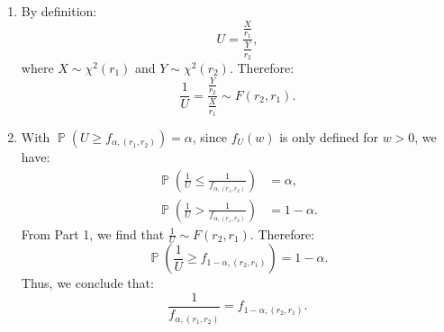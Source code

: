 \documentclass{huhtakm-template-book-v2}
\DeclareMathOperator{\prob}{\mathbb{P}}
\begin{document}
    \begin{proofing}
        \begin{enumerate}
            \item By definition:
            \begin{equation*}
                U = \frac{\frac{X}{r_{1}}}{\frac{Y}{r_{2}}},
            \end{equation*}
            where $X \sim \chi^{2}(r_{1})$ and $Y \sim \chi^{2}(r_{2})$. Therefore:
            \begin{equation*}
                \frac{1}{U} = \frac{\frac{Y}{r_{2}}}{\frac{X}{r_{1}}} \sim F(r_{2}, r_{1}).
            \end{equation*}
            \item With $\prob(U \geq f_{\alpha, (r_{1}, r_{2})}) = \alpha$, since $f_{U}(w)$ is only defined for $w > 0$, we have:
            \begin{align*}
                \prob\left(\frac{1}{U} \leq \frac{1}{f_{\alpha, (r_{1}, r_{2})}}\right) &= \alpha,\\
                \prob\left(\frac{1}{U} > \frac{1}{f_{\alpha, (r_{1}, r_{2})}}\right) &= 1 - \alpha.
            \end{align*}
            From Part 1, we find that $\frac{1}{U} \sim F(r_{2}, r_{1})$. Therefore:
            \begin{equation*}
                \prob\left(\frac{1}{U} \geq f_{1 - \alpha, (r_{2}, r_{1})}\right) = 1 - \alpha.
            \end{equation*}
            Thus, we conclude that:
            \begin{equation*}
                \frac{1}{f_{\alpha, (r_{1}, r_{2})}} = f_{1 - \alpha, (r_{2}, r_{1})}.
            \end{equation*}
        \end{enumerate}
    \end{proofing}
    \newpage
\end{document}
